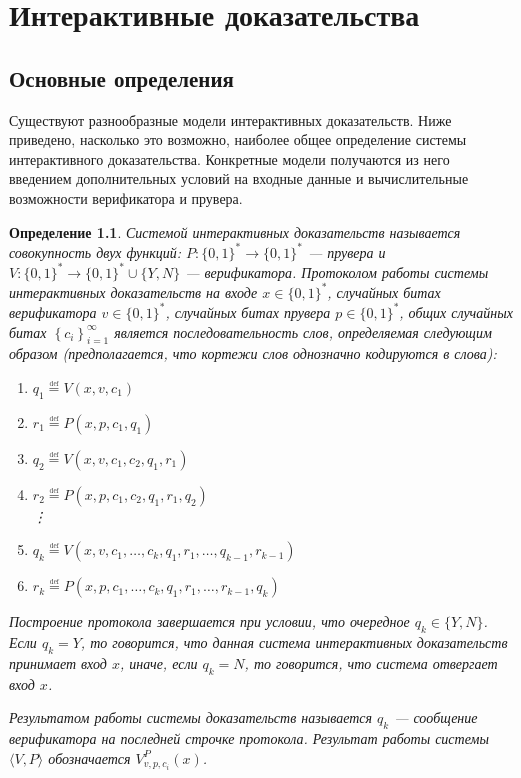 \documentclass[14pt, a4paper]{extreport}
\newtheorem{definition}{\indent Определение}
\newcommand{\word}{\{0, 1\}^*}
\newcommand{\defeq}{\overset{\underset{\mathrm{def}}{}}{=}}
\begin{document}
\chapter{Интерактивные доказательства}
\section{Основные определения}
Существуют разнообразные модели интерактивных доказательств. Ниже приведено, насколько это возможно, наиболее общее определение системы интерактивного доказательства. Конкретные модели получаются из него введением дополнительных условий на входные данные и вычислительные возможности верификатора и прувера.
\begin{definition}\label{ip_system}
    Системой интерактивных доказательств называется совокупность двух функций: $P: \word \longrightarrow \word$ --- прувера и $V: \word \longrightarrow \word \cup \{Y, N\}$ --- верификатора. Протоколом работы системы интерактивных доказательств на входе $x \in \word$, случайных битах верификатора $v \in \word$, случайных битах прувера $p \in \word$, общих случайных битах $\left\{c_i\right\}_{i=1}^{\infty}$ является последовательность слов, определяемая следующим образом (предполагается, что кортежи слов однозначно кодируются в слова):
    \begin{enumerate}
        \item $q_1 \defeq V(x, v, c_1)$
        \item $r_1 \defeq P(x, p, c_1, q_1)$
        \item $q_2 \defeq V(x, v, c_1, c_2, q_1, r_1)$
        \item $r_2 \defeq P(x, p, c_1, c_2, q_1, r_1, q_2)$\\
            \vdots
        \item [(2k-1).] $q_k \defeq V(x, v, c_1, \ldots, c_k, q_1, r_1, \ldots, q_{k-1}, r_{k-1})$
        \item [(2k).] $r_k \defeq P(x, p, c_1, \ldots, c_k, q_1, r_1, \ldots, r_{k-1}, q_k)$
    \end{enumerate}
    Построение протокола завершается при условии, что очередное $q_k \in \{Y, N\}$. Если $q_k = Y$, то говорится, что данная система интерактивных доказательств принимает вход $x$, иначе, если $q_k = N$, то говорится, что система отвергает вход $x$.

    Результатом работы системы доказательств называется $q_k$ --- сообщение верификатора на последней строчке протокола. Результат работы системы $\langle V, P\rangle$ обозначается $V^{P}_{v, p, c_i}(x)$.
\end{definition}
\end{document}

